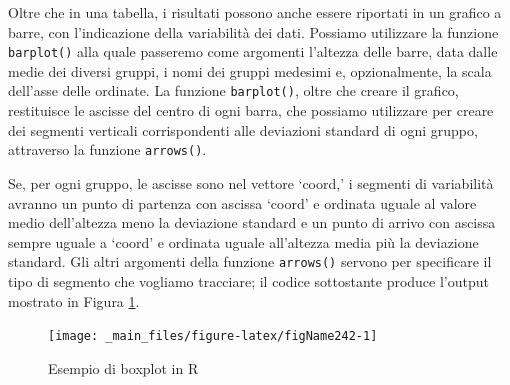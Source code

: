 \documentclass[a4paper,12pt,oneside]{book}
\newenvironment{Shaded}{\begin{snugshade}}{\end{snugshade}}
\newcommand{\DecValTok}[1]{#1}
\newcommand{\FloatTok}[1]{#1}
\newcommand{\SpecialCharTok}[1]{#1}
\newcommand{\OtherTok}[1]{#1}
\newcommand{\FunctionTok}[1]{#1}
\newcommand{\AttributeTok}[1]{#1}
\newcommand{\NormalTok}[1]{#1}
\begin{document}
Oltre che in una tabella, i risultati possono anche essere riportati in un grafico a barre, con l'indicazione della variabilità dei dati. Possiamo utilizzare la funzione \texttt{barplot()} alla quale passeremo come argomenti l'altezza delle barre, data dalle medie dei diversi gruppi, i nomi dei gruppi medesimi e, opzionalmente, la scala dell'asse delle ordinate. La funzione \texttt{barplot()}, oltre che creare il grafico, restituisce le ascisse del centro di ogni barra, che possiamo utilizzare per creare dei segmenti verticali corrispondenti alle deviazioni standard di ogni gruppo, attraverso la funzione \texttt{arrows()}.

Se, per ogni gruppo, le ascisse sono nel vettore `coord,' i segmenti di variabilità avranno un punto di partenza con ascissa `coord' e ordinata uguale al valore medio dell'altezza meno la deviazione standard e un punto di arrivo con ascissa sempre uguale a `coord' e ordinata uguale all'altezza media più la deviazione standard. Gli altri argomenti della funzione \texttt{arrows()} servono per specificare il tipo di segmento che vogliamo tracciare; il codice sottostante produce l'output mostrato in Figura \ref{fig:figName242}.

\begin{Shaded}
\end{Shaded}

\begin{figure}

{\centering \texttt{[image: \_main\_files/figure-latex/figName242-1]} 

}

\caption{Esempio di boxplot in R}\label{fig:figName242}
\end{figure}
\end{document}

